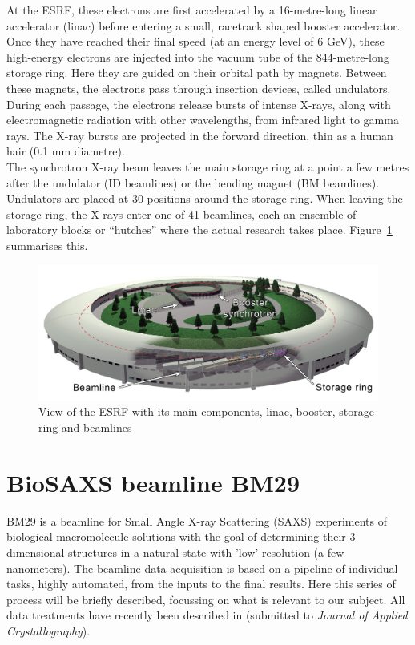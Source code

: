 \documentclass[a4paper, 11pt]{report}
\begin{document}
At the ESRF, these electrons are first accelerated by a 16-metre-long 
linear accelerator (linac) before entering a small, racetrack shaped 
booster accelerator. 
Once they have reached their final speed (at an energy level of 6 GeV), 
these high-energy electrons are injected into the vacuum tube of the
844-metre-long storage ring.
Here they are guided on their orbital path by magnets. 
Between these magnets, the electrons pass through insertion 
devices, called undulators.
During each passage, the electrons release bursts of intense X-rays, 
along with electromagnetic radiation with other wavelengths, from 
infrared light to gamma rays. 
The X-ray bursts are projected in the forward direction, thin as a 
human hair (0.1 mm diametre).\\

The synchrotron X-ray beam leaves the main storage ring at a point a 
few metres after the undulator (ID beamlines) or the bending magnet 
(BM beamlines). 
Undulators are placed at 30 positions around the storage ring.
When leaving the storage ring, the X-rays enter one of 41 beamlines, 
each an ensemble of laboratory blocks or “hutches” where the actual 
research takes place. 
Figure~\ref{fgr:synchrotron} summarises this.

\begin{figure}
\centering
\includegraphics[scale=0.22]{synchrotron.png}
\caption{View of the ESRF with its main components, linac, booster, 
    storage ring and beamlines}
\label{fgr:synchrotron}
\end{figure}

\section{BioSAXS beamline BM29}
\label{bm29}
BM29 \cite{BM29paper} is a beamline for Small Angle X-ray Scattering 
(SAXS) experiments of biological macromolecule solutions with the goal 
of determining their 3-dimensional structures in a natural state with 
'low' resolution (a few nanometers). 
The beamline data acquisition is based on a pipeline of individual 
tasks, highly automated, from the inputs to the final results. 
Here this series of process will be briefly described, focussing on 
what is relevant to our subject.
All data treatments have recently been described in \cite{BM29news} 
(submitted to \textit{Journal of Applied Crystallography}).
\end{document}
